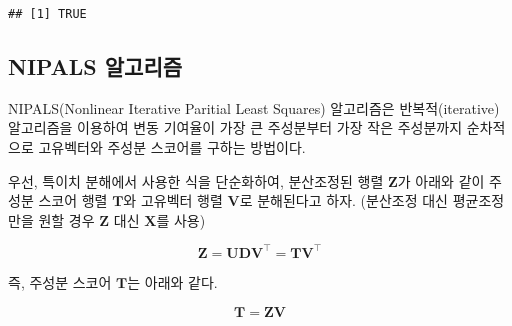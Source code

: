\documentclass[
]{book}
\newenvironment{Shaded}{\begin{snugshade}}{\end{snugshade}}
\newcommand{\FunctionTok}[1]{\textcolor[rgb]{0.00,0.00,0.00}{#1}}
\newcommand{\NormalTok}[1]{#1}
\newcommand{\OtherTok}[1]{\textcolor[rgb]{0.56,0.35,0.01}{#1}}
\newcommand{\SpecialCharTok}[1]{\textcolor[rgb]{0.00,0.00,0.00}{#1}}
\begin{document}
\begin{Shaded}
\end{Shaded}

\begin{verbatim}
## [1] TRUE
\end{verbatim}

\hypertarget{pca-nipals}{%
\subsection{NIPALS 알고리즘}\label{pca-nipals}}

NIPALS(Nonlinear Iterative Paritial Least Squares) 알고리즘은 반복적(iterative) 알고리즘을 이용하여 변동 기여율이 가장 큰 주성분부터 가장 작은 주성분까지 순차적으로 고유벡터와 주성분 스코어를 구하는 방법이다.

우선, 특이치 분해에서 사용한 식을 단순화하여, 분산조정된 행렬 \(\mathbf{Z}\)가 아래와 같이 주성분 스코어 행렬 \(\mathbf{T}\)와 고유벡터 행렬 \(\mathbf{V}\)로 분해된다고 하자. (분산조정 대신 평균조정만을 원할 경우 \(\mathbf{Z}\) 대신 \(\mathbf{X}\)를 사용)

\[ \mathbf{Z} = \mathbf{U} \mathbf{D} \mathbf{V}^\top = \mathbf{T} \mathbf{V}^\top \]

즉, 주성분 스코어 \(\mathbf{T}\)는 아래와 같다.

\[ \mathbf{T} = \mathbf{Z} \mathbf{V} \]

\begin{Shaded}
\end{Shaded}
\end{document}
